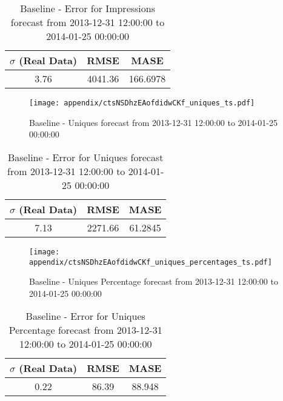 \begin{table}[H]
\centering
\footnotesize
\begin{tabular}{ccc}
$\sigma$ (Real Data) & RMSE & MASE   \\ \hline
3.76 & 4041.36 & 166.6978 \\
\end{tabular}

\vspace{0.5cm}

\caption{
Baseline - Error for Impressions forecast from 2013-12-31 12:00:00 to 2014-01-25 00:00:00}
\end{table}

\begin{figure}[H] \begin{center} \leavevmode
\texttt{[image: appendix/ctsNSDhzEAofdidwCKf\_uniques\_ts.pdf]} \caption{
Baseline - Uniques forecast from 2013-12-31 12:00:00 to 2014-01-25 00:00:00} \label{fig:appendix/ctsNSDhzEAofdidwCKf_uniques_ts.pdf} \end{center}
\end{figure}

\begin{table}[H]
\centering
\footnotesize
\begin{tabular}{ccc}
$\sigma$ (Real Data) & RMSE & MASE   \\ \hline
7.13 & 2271.66 & 61.2845 \\
\end{tabular}

\vspace{0.5cm}

\caption{
Baseline - Error for Uniques forecast from 2013-12-31 12:00:00 to 2014-01-25 00:00:00}
\end{table}

\begin{figure}[H] \begin{center} \leavevmode
\texttt{[image: appendix/ctsNSDhzEAofdidwCKf\_uniques\_percentages\_ts.pdf]} \caption{
Baseline - Uniques Percentage forecast from 2013-12-31 12:00:00 to 2014-01-25 00:00:00} \label{fig:appendix/ctsNSDhzEAofdidwCKf_uniques_percentages_ts.pdf} \end{center}
\end{figure}

\begin{table}[H]
\centering
\footnotesize
\begin{tabular}{ccc}
$\sigma$ (Real Data) & RMSE & MASE   \\ \hline
0.22 & 86.39 & 88.948 \\
\end{tabular}

\vspace{0.5cm}

\caption{
Baseline - Error for Uniques Percentage forecast from 2013-12-31 12:00:00 to 2014-01-25 00:00:00}
\end{table}

